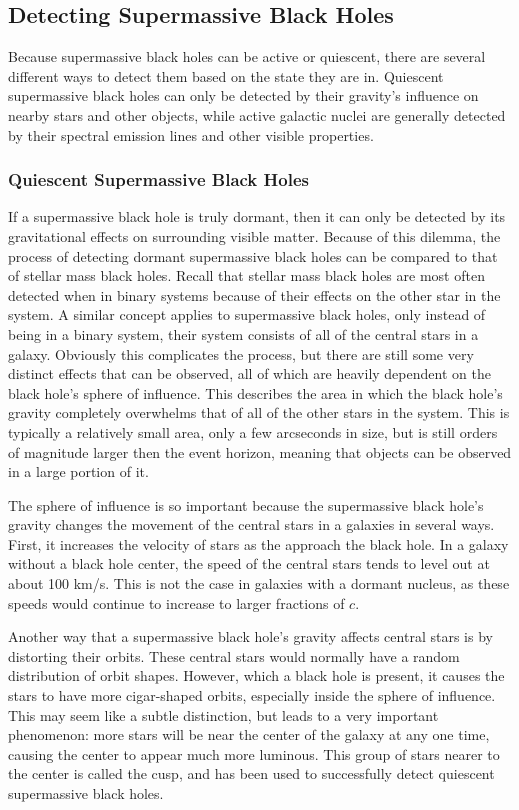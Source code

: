 \documentclass[12pt]{article}
\begin{document}
\subsection{Detecting Supermassive Black Holes}
Because supermassive black holes can be active or quiescent, there are several
different ways to detect them based on the state they are in.  Quiescent
supermassive black holes can only be detected by their gravity's influence on
nearby stars and other objects, while active galactic nuclei are generally
detected by their spectral emission lines and other visible properties.

    \subsubsection{Quiescent Supermassive Black Holes}
    If a supermassive black hole is truly dormant, then it can only be detected
    by its gravitational effects on surrounding visible matter.  Because of
    this dilemma, the process of detecting dormant supermassive black holes can
    be compared to that of stellar mass black holes.  Recall that stellar mass
    black holes are most often detected when in binary systems because of their
    effects on the other star in the system.  A similar concept applies to
    supermassive black holes, only instead of being in a binary system, their
    system consists of all of the central stars in a galaxy.  Obviously this
    complicates the process, but there are still some very distinct effects that
    can be observed, all of which are heavily dependent on the black hole's
    sphere of influence.  This describes the area in which the black hole's
    gravity completely overwhelms that of all of the other stars in the system.
    This is typically a relatively small area, only a few arcseconds in size,
    but is still orders of magnitude larger then the event horizon, meaning that
    objects can be observed in a large portion of it.

    The sphere of influence is so important because the supermassive black
    hole's gravity changes the movement of the central stars in a galaxies in
    several ways.  First, it increases the velocity of stars as the approach the
    black hole.  In a galaxy without a black hole center, the speed of the
    central stars tends to level out at about 100 km/s.  This is not the case in
    galaxies with a dormant nucleus, as these speeds would continue to increase
    to larger fractions of $c$.

    Another way that a supermassive black hole's gravity affects central stars
    is by distorting their orbits.  These central stars would normally have a
    random distribution of orbit shapes.  However, which a black hole is
    present, it causes the stars to have more cigar-shaped orbits, especially
    inside the sphere of influence.  This may seem like a subtle distinction,
    but leads to a very important phenomenon: more stars will be near the center
    of the galaxy at any one time, causing the center to appear much more
    luminous.  This group of stars nearer to the center is called the cusp, and
    has been used to successfully detect quiescent supermassive black holes.
\end{document}
